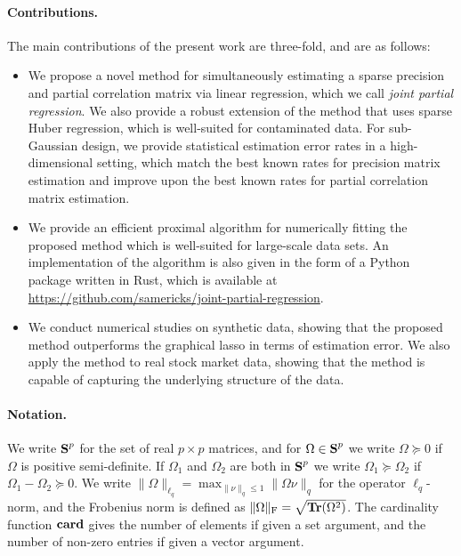 \documentclass{article}
\begin{document}
\paragraph{Contributions.} The main contributions of the present work are three-fold,
and are as follows: 
\begin{itemize}

    \item We propose a novel method for simultaneously estimating a sparse
        precision and partial correlation matrix via linear regression, which
        we call \emph{joint partial regression}. We also provide a robust
        extension of the method that uses sparse Huber regression, which is
        well-suited for contaminated data. For sub-Gaussian design, we provide
        statistical estimation error rates in a high-dimensional setting, which
        match the best known rates for precision matrix estimation and improve
        upon the best known rates for partial correlation matrix estimation.

    \item We provide an efficient proximal algorithm for numerically fitting
        the proposed method which is well-suited for large-scale data sets. An
        implementation of the algorithm is also given in the form of a Python
        package written in Rust, which is available at
        \url{https://github.com/samericks/joint-partial-regression}.

    \item We conduct numerical studies on synthetic data, showing that the
        proposed method outperforms the graphical lasso in terms of estimation
        error. We also apply the method to real stock market data, showing that
        the method is capable of capturing the underlying structure of the
        data. 

\end{itemize}


\paragraph{Notation.} We write $\mbox{\bf S}^p$ for the set of real $p\times p$
matrices, and for $\Omega\in\mbox{\bf S}^p$ we write $\Omega\succeq 0$  if $\Omega$ is
positive semi-definite. If $\Omega_1$ and $\Omega_2$ are both in $\mbox{\bf S}^p$ we
write $\Omega_1\succeq\Omega_2$ if $\Omega_1 - \Omega_2 \succeq 0$. We write
$\|\Omega\|_{\ell_q} = \max_{\|\nu\|_q \leq 1} \|\Omega \nu\|_q$ for the
operator $\ell_q$-norm, and the Frobenius norm is defined as $\|\Omega\|_{\rm
F} = \sqrt{\mathop{\bf Tr}(\Omega^2)}$. The cardinality function $\mathop{\bf card}$ gives the number
of elements if given a set argument, and the number of non-zero entries if
given a vector argument. 
\end{document}
